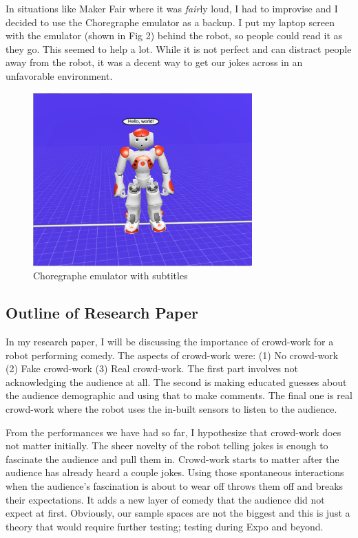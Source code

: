 \documentclass[onecolumn, draftclsnofoot,10pt, compsoc]{IEEEtran}
\begin{document}
In situations like Maker Fair where it was \textit{fair}ly loud, I had to improvise and I decided to use the Choregraphe emulator as a backup. I put my laptop screen with the emulator (shown in Fig 2) behind the robot, so people could read it as they go. This seemed to help a lot. While it is not perfect and can distract people away from the robot, it was a decent way to get our jokes across in an unfavorable environment.

\begin{figure}[H]
  \centering
  \includegraphics[width=0.75\textwidth,height=0.75\textheight,keepaspectratio]{comedy-2.png}
  \caption{Choregraphe emulator with subtitles}
	\label{fig:comedy-2}
\end{figure}

\subsection{Outline of Research Paper}
In my research paper, I will be discussing the importance of crowd-work for a robot performing comedy. The aspects of crowd-work were: (1) No crowd-work (2) Fake crowd-work (3) Real crowd-work. The first part involves not acknowledging the audience at all. The second is making educated guesses about the audience demographic and using that to make comments. The final one is real crowd-work where the robot uses the in-built sensors to listen to the audience.

From the performances we have had so far, I hypothesize that crowd-work does not matter initially. The sheer novelty of the robot telling jokes is enough to fascinate the audience and pull them in. Crowd-work starts to matter after the audience has already heard a couple jokes. Using those spontaneous interactions when the audience's fascination is about to wear off throws them off and breaks their expectations. It adds a new layer of comedy that the audience did not expect at first. Obviously, our sample spaces are not the biggest and this is just a theory that would require further testing; testing during Expo and beyond. 
\end{document}
